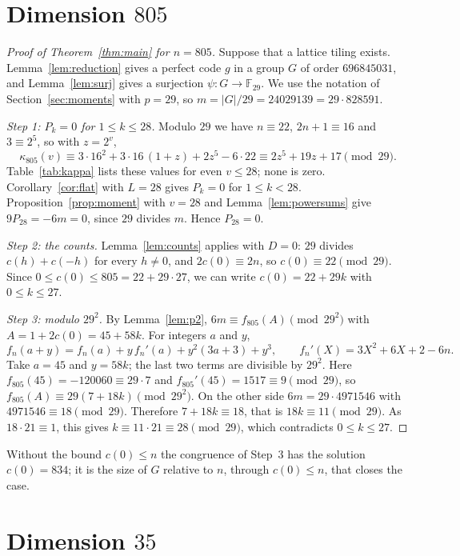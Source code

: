 \documentclass{amsart}
\theoremstyle{definition}
\theoremstyle{remark}
\numberwithin{equation}{section}
\newcommand{\F}{\mathbb{F}}
\begin{document}
\section{Dimension \texorpdfstring{$805$}{805}}\label{sec:805}

\begin{proof}[Proof of Theorem~\ref{thm:main} for $n=805$]
Suppose that a lattice tiling exists. Lemma~\ref{lem:reduction} gives a perfect code $g$ in a group $G$ of order $696845031$, and Lemma~\ref{lem:surj} gives a surjection $\psi\colon G\to\F_{29}$. We use the notation of Section~\ref{sec:moments} with $p=29$, so $m=|G|/29=24029139=29\cdot828591$.

\emph{Step 1: $P_k=0$ for $1\le k\le28$.} Modulo $29$ we have $n\equiv22$, $2n+1\equiv16$ and $3\equiv2^5$, so with $z=2^v$,
\[
\kappa_{805}(v)\equiv3\cdot16^2+3\cdot16\,(1+z)+2z^5-6\cdot22\equiv2z^5+19z+17\pmod{29}.
\]
Table~\ref{tab:kappa} lists these values for even $v\le28$; none is zero. Corollary~\ref{cor:flat} with $L=28$ gives $P_k=0$ for $1\le k<28$. Proposition~\ref{prop:moment} with $v=28$ and Lemma~\ref{lem:powersums} give $9P_{28}=-6m=0$, since $29$ divides $m$. Hence $P_{28}=0$.

\emph{Step 2: the counts.} Lemma~\ref{lem:counts} applies with $D=0$: $29$ divides $c(h)+c(-h)$ for every $h\ne0$, and $2c(0)\equiv2n$, so $c(0)\equiv22\pmod{29}$. Since $0\le c(0)\le805=22+29\cdot27$, we can write $c(0)=22+29k$ with $0\le k\le27$.

\emph{Step 3: modulo $29^2$.} By Lemma~\ref{lem:p2}, $6m\equiv f_{805}(A)\pmod{29^2}$ with $A=1+2c(0)=45+58k$. For integers $a$ and $y$,
\[
f_n(a+y)=f_n(a)+y\,f_n'(a)+y^2(3a+3)+y^3,\qquad f_n'(X)=3X^2+6X+2-6n.
\]
Take $a=45$ and $y=58k$; the last two terms are divisible by $29^2$. Here $f_{805}(45)=-120060\equiv29\cdot7$ and $f_{805}'(45)=1517\equiv9\pmod{29}$, so $f_{805}(A)\equiv29(7+18k)\pmod{29^2}$. On the other side $6m=29\cdot4971546$ with $4971546\equiv18\pmod{29}$. Therefore $7+18k\equiv18$, that is $18k\equiv11\pmod{29}$. As $18\cdot21\equiv1$, this gives $k\equiv11\cdot21\equiv28\pmod{29}$, which contradicts $0\le k\le27$.
\end{proof}

Without the bound $c(0)\le n$ the congruence of Step~3 has the solution $c(0)=834$; it is the size of $G$ relative to $n$, through $c(0)\le n$, that closes the case.

\section{Dimension \texorpdfstring{$35$}{35}}\label{sec:35}
\end{document}

